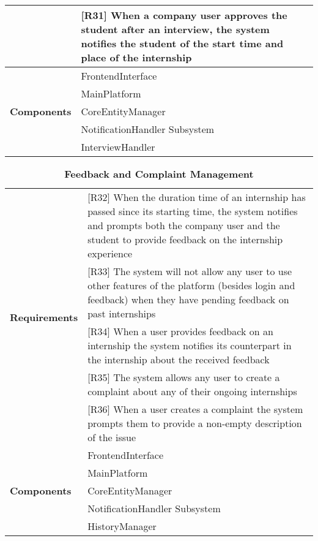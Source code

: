 \begin{longtable}{|p{}|p{}|}
& [R31] When a company user approves the student after an interview, the system notifies the student of the start time and place of the internship \\ \hline
\multirow{5}{*}{\textbf{Components}} 
& FrontendInterface \\  
& MainPlatform \\  
& CoreEntityManager \\  
& NotificationHandler Subsystem\\  
& InterviewHandler \\ \hline
\end{longtable}

\renewcommand{\arraystretch}{1.3}
\begin{longtable}{|p{}|p{}|}
\caption{\textbf{Feedback and Complaint Management}} \\ \hline
\multirow{5}{*}{\textbf{Requirements}}
& [R32] When the duration time of an internship has passed since its starting time, the system notifies and prompts both the company user and the student to provide feedback on the internship experience \\
& [R33] The system will not allow any user to use other features of the platform (besides login and feedback) when they have pending feedback on past internships \\
& [R34] When a user provides feedback on an internship the system notifies its counterpart in the internship about the received feedback \\
& [R35] The system allows any user to create a complaint about any of their ongoing internships \\
& [R36] When a user creates a complaint the system prompts them to provide a non-empty description of the issue \\
\hline
\multirow{5}{*}{\textbf{Components}} 
& FrontendInterface \\
& MainPlatform \\
& CoreEntityManager \\
& NotificationHandler Subsystem\\
& HistoryManager \\
\hline
\end{longtable}

